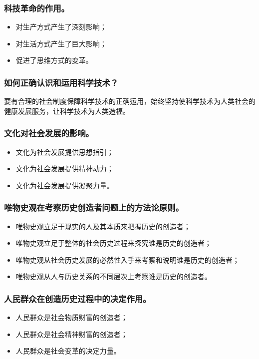 \documentclass{article}
\begin{document}
\subsubsection{科技革命的作用。}
\begin{itemize}
    \item 对生产方式产生了深刻影响；
    \item 对生活方式产生了巨大影响；
    \item 促进了思维方式的变革。
\end{itemize}

\subsubsection{如何正确认识和运用科学技术？}
要有合理的社会制度保障科学技术的正确运用，始终坚持使科学技术为人类社会的健康发展服务，让科学技术为人类造福。

\subsubsection{文化对社会发展的影响。}
\begin{itemize}
    \item 文化为社会发展提供思想指引；
    \item 文化为社会发展提供精神动力；
    \item 文化为社会发展提供凝聚力量。
\end{itemize}

\subsubsection{唯物史观在考察历史创造者问题上的方法论原则。}
\begin{itemize}
    \item 唯物史观立足于现实的人及其本质来把握历史的创造者；
    \item 唯物史观立足于整体的社会历史过程来探究谁是历史的创造者；
    \item 唯物史观从社会历史发展的必然性入手来考察和说明谁是历史的创造者；
    \item 唯物史观从人与历史关系的不同层次上考察谁是历史的创造者。
\end{itemize}

\subsubsection{人民群众在创造历史过程中的决定作用。}
\begin{itemize}
    \item 人民群众是社会物质财富的创造者；
    \item 人民群众是社会精神财富的创造者；
    \item 人民群众是社会变革的决定力量。
\end{itemize}
\end{document}
